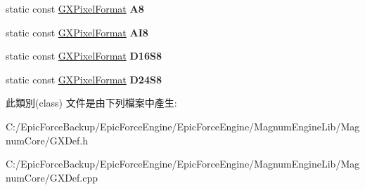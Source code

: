 \begin{DoxyCompactItemize}
\item 
static const \hyperlink{class_magnum_1_1_g_x_pixel_format}{G\+X\+Pixel\+Format} {\bfseries A8}\hypertarget{class_magnum_1_1_g_x_pixel_format_a97a17e2d3080f860bea7e3076db79856}{}\label{class_magnum_1_1_g_x_pixel_format_a97a17e2d3080f860bea7e3076db79856}

\item 
static const \hyperlink{class_magnum_1_1_g_x_pixel_format}{G\+X\+Pixel\+Format} {\bfseries A\+I8}\hypertarget{class_magnum_1_1_g_x_pixel_format_aa01ed67cca9301f76ee197b3d27891df}{}\label{class_magnum_1_1_g_x_pixel_format_aa01ed67cca9301f76ee197b3d27891df}

\item 
static const \hyperlink{class_magnum_1_1_g_x_pixel_format}{G\+X\+Pixel\+Format} {\bfseries D16\+S8}\hypertarget{class_magnum_1_1_g_x_pixel_format_a4976ded53dfa9f6efe92f0876ce373ed}{}\label{class_magnum_1_1_g_x_pixel_format_a4976ded53dfa9f6efe92f0876ce373ed}

\item 
static const \hyperlink{class_magnum_1_1_g_x_pixel_format}{G\+X\+Pixel\+Format} {\bfseries D24\+S8}\hypertarget{class_magnum_1_1_g_x_pixel_format_af77b1b41ff6227a4328bde3c2e49a155}{}\label{class_magnum_1_1_g_x_pixel_format_af77b1b41ff6227a4328bde3c2e49a155}

\end{DoxyCompactItemize}


此類別(class) 文件是由下列檔案中產生\+:\begin{DoxyCompactItemize}
\item 
C\+:/\+Epic\+Force\+Backup/\+Epic\+Force\+Engine/\+Epic\+Force\+Engine/\+Magnum\+Engine\+Lib/\+Magnum\+Core/G\+X\+Def.\+h\item 
C\+:/\+Epic\+Force\+Backup/\+Epic\+Force\+Engine/\+Epic\+Force\+Engine/\+Magnum\+Engine\+Lib/\+Magnum\+Core/G\+X\+Def.\+cpp\end{DoxyCompactItemize}
